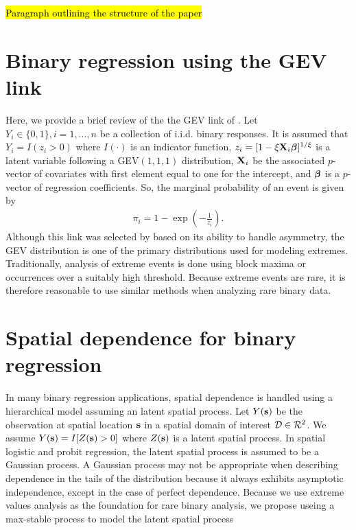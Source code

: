 \documentclass[11pt]{article}
\begin{document}
\hl{Paragraph outlining the structure of the paper}

\section{Binary regression using the GEV link}\label{s:rarebinary}

Here, we provide a brief review of the the GEV link of \citet{Wang2010}.
Let $Y_i \in \{0, 1\}, i = 1, \ldots, n$ be a collection of i.i.d. binary responses.
It is assumed that $Y_i = I(z_i > 0)$ where $I(\cdot)$ is an indicator function, $z_i = [1 - \xi \mbox{\bf X}_i \mbox{\boldmath $\beta$}]^{1 / \xi}$ is a latent variable following a GEV$(1, 1, 1)$ distribution, $\mbox{\bf X}_i$ be the associated $p$-vector of covariates with first element equal to one for the intercept, and $\mbox{\boldmath $\beta$}$ is a $p$-vector of regression coefficients.
So, the marginal probability of an event is given by
\begin{align} \label{eq:gevlink}
  \pi_i= 1 - \exp \left( -\frac{ 1 }{ z_i } \right).
\end{align}
Although this link was selected by \citeauthor{Wang2010} based on its ability to handle asymmetry, the GEV distribution is one of the primary distributions used for modeling extremes.
Traditionally, analysis of extreme events is done using block maxima or occurrences over a suitably high threshold.
Because extreme events are rare, it is therefore reasonable to use similar methods when analyzing rare binary data.

\section{Spatial dependence for binary regression}

In many binary regression applications, spatial dependence is handled using a hierarchical model assuming an latent spatial process.
Let $Y(\mbox{\bf s})$ be the observation at spatial location $\mbox{\bf s}$ in a spatial domain of interest ${\cal D} \in {\cal R}^2$.
We assume $Y(\mbox{\bf s}) = I[Z(\mbox{\bf s}) > 0]$ where $Z(\mbox{\bf s})$ is a latent spatial process.
In spatial logistic and probit regression, the latent spatial process is assumed to be a Gaussian process.
A Gaussian process may not be appropriate when describing dependence in the tails of the distribution because it always exhibits asymptotic independence, except in the case of perfect dependence.
Because we use extreme values analysis as the foundation for rare binary analysis, we propose useing a max-stable process to model the latent spatial process
\end{document}
